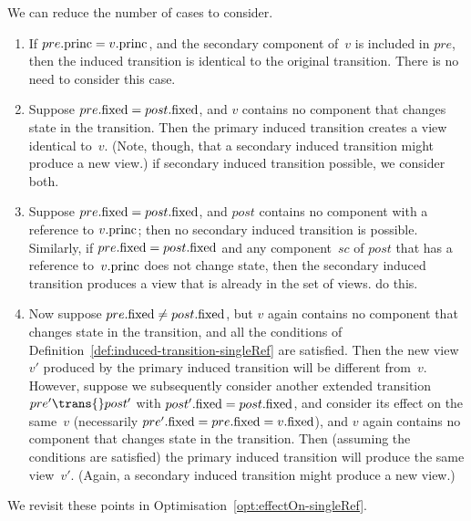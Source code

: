 %
\begin{opt}
\label{opt:induced-trans-singleRef}
We can reduce the number of cases to consider.
%
\begin{enumerate}
\item\label{case:opt-induced-trans-singleRef-1} If $pre.\mathrm{princ} = v.\mathrm{princ}$,
  and the secondary component of~$v$ is included in $pre$, then the induced
  transition is identical to the original transition.  There is no need to
  consider this case. 

\item\label{case:opt-induced-trans-singleRef-2} Suppose $pre.\mathrm{fixed} =
  post.\mathrm{fixed}$, and $v$ contains no component that changes state in the
  transition.  Then the primary induced transition creates a view identical
  to~$v$.  (Note, though, that a secondary induced transition might produce a
  new view.)   if secondary induced transition possible, we
  consider both.

\item\label{case:opt-induced-trans-singleRef-3} Suppose $pre.\mathrm{fixed} =
  post.\mathrm{fixed}$, and $post$ contains no component with a reference to
  $v.\mathrm{princ}$; then no secondary induced transition is possible.  Similarly, if
  $pre.\mathrm{fixed} = post.\mathrm{fixed}$ and any component~$sc$ of $post$ that has a
  reference to~$v.\mathrm{princ}$ does not change state, then the secondary induced
  transition produces a view that is already in the set of views. 
   do this.

\item\label{case:opt-induced-trans-singleRef-4} Now suppose $pre.\mathrm{fixed} \ne
  post.\mathrm{fixed}$, but $v$ again contains no component that changes state in the
  transition, and all the conditions of
  Definition~\ref{def:induced-transition-singleRef} are satisfied. Then the
  new view~$v'$ produced by the primary induced transition will be different
  from~$v$.  However, suppose we subsequently consider another extended
  transition $pre' \trans{} post'$ with $post'.\mathrm{fixed} = post.\mathrm{fixed}$, and
  consider its effect on the same~$v$ (necessarily $pre'.\mathrm{fixed} = pre.\mathrm{fixed} =
  v.\mathrm{fixed}$), and $v$ again contains no component that changes state in the
  transition.  Then (assuming the conditions are satisfied) the primary
  induced transition will produce the same view~$v'$.  (Again, a secondary
  induced transition might produce a new view.)  
\end{enumerate}
We revisit these points in Optimisation~\ref{opt:effectOn-singleRef}.
\end{opt}

